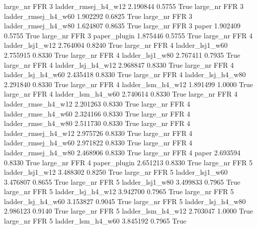   large_nr      FFR                 3 ladder_rmsej_h4_w12    2.190844      0.5755    True
  large_nr      FFR                 3 ladder_rmsej_h4_w60    1.902292      0.6825    True
  large_nr      FFR                 3 ladder_rmsej_h4_w80    1.624807      0.8635    True
  large_nr      FFR                 3               paper    1.902409      0.5755    True
  large_nr      FFR                 3        paper_plugin    1.875446      0.5755    True
  large_nr      FFR                 4     ladder_lsj1_w12    2.764004      0.8240    True
  large_nr      FFR                 4     ladder_lsj1_w60    2.755915      0.8330    True
  large_nr      FFR                 4     ladder_lsj1_w80    2.767411      0.7935    True
  large_nr      FFR                 4   ladder_lsj_h4_w12    2.968847      0.8330    True
  large_nr      FFR                 4   ladder_lsj_h4_w60    2.435418      0.8330    True
  large_nr      FFR                 4   ladder_lsj_h4_w80    2.291840      0.8330    True
  large_nr      FFR                 4   ladder_lsm_h4_w12    1.891499      1.0000    True
  large_nr      FFR                 4   ladder_lsm_h4_w60    2.740614      0.8330    True
  large_nr      FFR                 4  ladder_rmse_h4_w12    2.201263      0.8330    True
  large_nr      FFR                 4  ladder_rmse_h4_w60    2.324166      0.8330    True
  large_nr      FFR                 4  ladder_rmse_h4_w80    2.511730      0.8330    True
  large_nr      FFR                 4 ladder_rmsej_h4_w12    2.975726      0.8330    True
  large_nr      FFR                 4 ladder_rmsej_h4_w60    2.971822      0.8330    True
  large_nr      FFR                 4 ladder_rmsej_h4_w80    2.468906      0.8330    True
  large_nr      FFR                 4               paper    2.693594      0.8330    True
  large_nr      FFR                 4        paper_plugin    2.651213      0.8330    True
  large_nr      FFR                 5     ladder_lsj1_w12    3.488302      0.8250    True
  large_nr      FFR                 5     ladder_lsj1_w60    3.476807      0.8655    True
  large_nr      FFR                 5     ladder_lsj1_w80    3.499833      0.7965    True
  large_nr      FFR                 5   ladder_lsj_h4_w12    3.942700      0.7965    True
  large_nr      FFR                 5   ladder_lsj_h4_w60    3.153827      0.9045    True
  large_nr      FFR                 5   ladder_lsj_h4_w80    2.986123      0.9140    True
  large_nr      FFR                 5   ladder_lsm_h4_w12    2.703047      1.0000    True
  large_nr      FFR                 5   ladder_lsm_h4_w60    3.845192      0.7965    True

